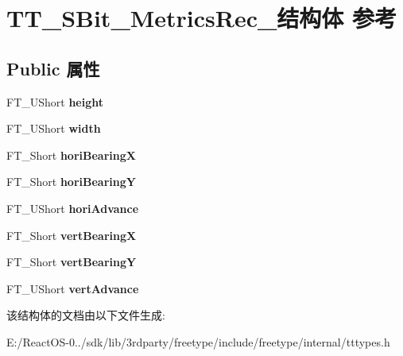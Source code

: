 \hypertarget{struct_t_t___s_bit___metrics_rec__}{}\section{T\+T\+\_\+\+S\+Bit\+\_\+\+Metrics\+Rec\+\_\+结构体 参考}
\label{struct_t_t___s_bit___metrics_rec__}
\subsection*{Public 属性}
\begin{DoxyCompactItemize}
\item 
\mbox{\label{struct_t_t___s_bit___metrics_rec___abf873bc8f20ef5e3f951035d004b111a}} 
F\+T\+\_\+\+U\+Short {\bfseries height}
\item 
\mbox{\label{struct_t_t___s_bit___metrics_rec___acbb91730fb9201741d0e33f16b38b815}} 
F\+T\+\_\+\+U\+Short {\bfseries width}
\item 
\mbox{\label{struct_t_t___s_bit___metrics_rec___a2f9707efc2af0e2f5c1366d06b36dc41}} 
F\+T\+\_\+\+Short {\bfseries hori\+BearingX}
\item 
\mbox{\label{struct_t_t___s_bit___metrics_rec___a6d1198143ff292d14036e630a1f5470c}} 
F\+T\+\_\+\+Short {\bfseries hori\+BearingY}
\item 
\mbox{\label{struct_t_t___s_bit___metrics_rec___a5e1c50427d7168f749afa3ae3a6c19b8}} 
F\+T\+\_\+\+U\+Short {\bfseries hori\+Advance}
\item 
\mbox{\label{struct_t_t___s_bit___metrics_rec___a8f9290fe72d470b5a3d1b3cf51e50c78}} 
F\+T\+\_\+\+Short {\bfseries vert\+BearingX}
\item 
\mbox{\label{struct_t_t___s_bit___metrics_rec___a1b3240b24ca4acf498b803a84aa659ec}} 
F\+T\+\_\+\+Short {\bfseries vert\+BearingY}
\item 
\mbox{\label{struct_t_t___s_bit___metrics_rec___afdef8b583a6e7925727a6ff707f33051}} 
F\+T\+\_\+\+U\+Short {\bfseries vert\+Advance}
\end{DoxyCompactItemize}


该结构体的文档由以下文件生成\+:\begin{DoxyCompactItemize}
\item 
E\+:/\+React\+O\+S-\/0../sdk/lib/3rdparty/freetype/include/freetype/internal/tttypes.\+h\end{DoxyCompactItemize}
